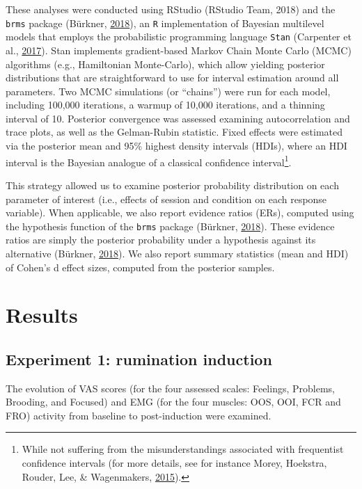 \documentclass[a4paper,12pt,twoside,openright,oldfontcommands]{memoir}
\let\rmarkdownfootnote\footnote%
\def\footnote{\protect\rmarkdownfootnote}
\begin{document}
These analyses were conducted using RStudio (RStudio Team, 2018) and the
\texttt{brms} package (Bürkner, \protect\hyperlink{ref-R-brms}{2018}),
an \texttt{R} implementation of Bayesian multilevel models that employs
the probabilistic programming language \texttt{Stan} (Carpenter et al.,
\protect\hyperlink{ref-carpenter_stan:_2017}{2017}). Stan implements
gradient-based Markov Chain Monte Carlo (MCMC) algorithms (e.g.,
Hamiltonian Monte-Carlo), which allow yielding posterior distributions
that are straightforward to use for interval estimation around all
parameters. Two MCMC simulations (or ``chains'') were run for each
model, including 100,000 iterations, a warmup of 10,000 iterations, and
a thinning interval of 10. Posterior convergence was assessed examining
autocorrelation and trace plots, as well as the Gelman-Rubin statistic.
Fixed effects were estimated via the posterior mean and 95\% highest
density intervals (HDIs), where an HDI interval is the Bayesian analogue
of a classical confidence interval\footnote{While not suffering from the
  misunderstandings associated with frequentist confidence intervals
  (for more details, see for instance Morey, Hoekstra, Rouder, Lee, \&
  Wagenmakers, \protect\hyperlink{ref-morey_fallacy_2015}{2015}).}.

This strategy allowed us to examine posterior probability distribution
on each parameter of interest (i.e., effects of session and condition on
each response variable). When applicable, we also report evidence ratios
(ERs), computed using the hypothesis function of the \texttt{brms}
package (Bürkner, \protect\hyperlink{ref-R-brms}{2018}). These evidence
ratios are simply the posterior probability under a hypothesis against
its alternative (Bürkner, \protect\hyperlink{ref-R-brms}{2018}). We also
report summary statistics (mean and HDI) of Cohen's d effect sizes,
computed from the posterior samples.

\section{Results}\label{results}

\subsection{Experiment 1: rumination
induction}\label{experiment-1-rumination-induction-1}

The evolution of VAS scores (for the four assessed scales: Feelings,
Problems, Brooding, and Focused) and EMG (for the four muscles: OOS,
OOI, FCR and FRO) activity from baseline to post-induction were
examined.
\end{document}
